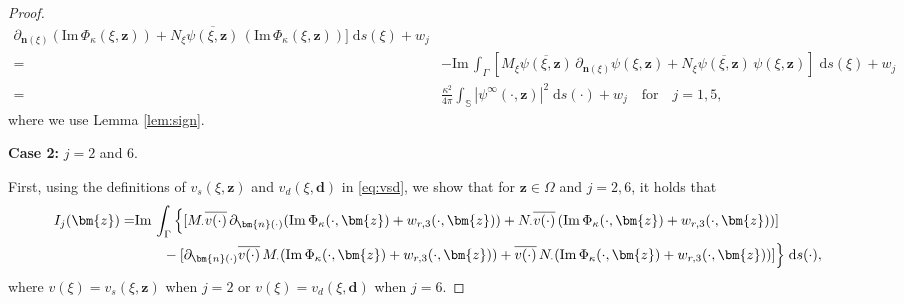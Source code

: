 \documentclass[10pt,a4paper]{article}
\numberwithin{equation}{section}
\begin{document}
\begin{proof}
\begin{align*}
              \partial_{\bm{n}(\xi )} (\mathrm{Im}\, \Phi_{\kappa}(\xi,\bm{z})  )
        +N_{\xi } \overline{\psi(\xi ,\bm{ z })} \,
        (\mathrm{Im}\, \Phi_{\kappa}(\xi,\bm{z}) ) ]   \;\mathrm{d}s(\xi) + w_j\\
     = & -\mathrm{Im}\, \int_{ \Gamma }[M_{\xi}\overline{\psi(\xi ,\bm{ z })} \,
              \partial_{\bm{n}(\xi )} \psi(\xi ,\bm{ z })
        + N_{\xi } \overline{\psi(\xi ,\bm{ z })} \,
              \psi(\xi ,\bm{ z }) ]   \;\mathrm{d}s(\xi) + w_j\\
     = & \frac{\kappa^{2}}{4\pi} \int_{ \mathbb{S}  } | \psi ^{\infty}(\cdot ,\bm{ z }) | ^{2} \;\mathrm{d}s(\cdot ) + w_j \quad \text{for} \quad j=1,5,
        \end{align*}
        where we use Lemma \ref{lem:sign}.

        \textbf{Case 2:} $j=2$ and $6$.

        First, using the definitions of $v_s(\xi ,\bm{ z })$ and $v_d(\xi ,\bm{ d })$  in \eqref{eq:vsd}, we show that for $\bm{ z }\in \Omega$ and $j=2,6$, it holds that
          \begin{align}
    \notag
             I_j(\bm{ z }) 
            = &\mathrm{Im}\, \int_{ \Gamma } \Big\{ [M_{\cdot}\overline{v(\cdot )}\, \partial_{\bm{n}(\cdot  )}
        (\mathrm{Im}\, \Phi_{\kappa}(\cdot ,\bm{z}) + w_{r,3}(\cdot,\bm{z}) )
        + N_{\cdot  } \overline{v(\cdot)}\,
        (\mathrm{Im}\, \Phi_{\kappa}(\cdot ,\bm{z}) + w_{r,3}(\cdot ,\bm{z}) ) ]  \\
    \label{eq:imaging-2}
   & \qquad - [ \partial_{\bm{n}(\cdot  )}\overline{v(\cdot )}\,  M_{\cdot  }
     ( \mathrm{Im}\, \Phi_{\kappa}(\cdot ,\bm{z}) + w_{r,3}(\cdot ,\bm{z})  )
     + \overline{v(\cdot )} \,  N_{\cdot }
     ( \mathrm{Im}\, \Phi_{\kappa}(\cdot ,\bm{z}) + w_{r,3}(\cdot ,\bm{z}) )
     ]  \Big\} \;\mathrm{d}s(\cdot ),
  \end{align}
  where $v(\xi)=v_s(\xi ,\bm{ z }) $ when $j=2$ or $v(\xi )= v_d(\xi ,\bm{ d })$ when $j=6$.


\end{proof}
\end{document}

